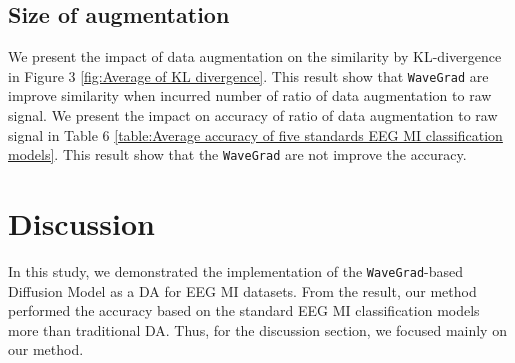\documentclass[runningheads]{llncs}
\begin{document}
\begin{table}[ht] 
\centering
\caption{\label{table:Average accuracy of five standards EEG MI classification models} Average accuracy of five standards EEG MI classification models}
\end{table}

\subsection{Size of augmentation}
We present the impact of data augmentation on the similarity by KL-divergence in Figure 3 \ref{fig:Average of KL divergence}. This result show that \texttt{WaveGrad} are improve similarity when incurred number of ratio of data augmentation to raw signal.
We present the impact on accuracy of ratio of data augmentation to raw signal  in Table 6 \ref{table:Average accuracy of five standards EEG MI classification models}. This result show that the \texttt{WaveGrad} are not improve the accuracy.




\section{Discussion}
In this study, we demonstrated the implementation of the \texttt{WaveGrad}-based Diffusion Model as a DA for EEG MI datasets. From the result, our method performed the accuracy based on the standard EEG MI classification models more than traditional DA. Thus, for the discussion section, we focused mainly on our method.
\end{document}
